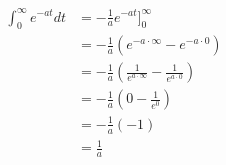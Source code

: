 \documentclass[9pt]{article}
\begin{document}
\begin{align*}
  \int_0^{\infty} e^{-at} dt &= -\frac{1}{a} e^{-at} \bigg]_0^{\infty} \\
  &= -\frac{1}{a} (e^{-a \cdot \infty} - e^{-a \cdot 0}) \\
  &= -\frac{1}{a} (\frac{1}{e^{a \cdot \infty}} - \frac{1}{e^{a \cdot 0}}) \\
  &= -\frac{1}{a} (0 - \frac{1}{e^0}) \\
  &= -\frac{1}{a} (-1) \\
  &= \frac{1}{a}
\end{align*}
\end{document}
